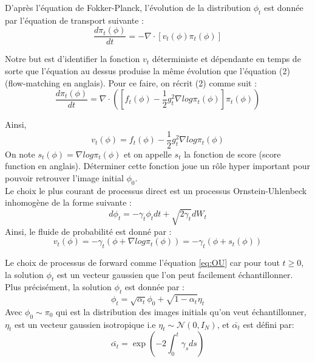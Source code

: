 \documentclass[a4paper,10pt]{article}
\theoremstyle{definition} %
\theoremstyle{definition} %
\theoremstyle{definition} %
\theoremstyle{definition} %
\begin{document}
D'après l'équation de Fokker-Planck, l'évolution de la distribution $\phi_t$ est donnée par l'équation de transport suivante :
\[\frac{d\pi_t(\phi)}{dt} =-\nabla \cdot [v_t(\phi)\pi_t(\phi)]\]

Notre but est d'identifier la fonction $v_t$ déterministe et dépendante en temps de sorte que l'équation au dessus produise la même évolution que l'équation (2) (flow-matching en anglais). Pour ce faire, on récrit (2) comme suit :
\[\frac{d\pi_t(\phi)}{dt} =\nabla \cdot([f_t(\phi)-\frac{1}{2}g_t^2\nabla log\pi_t(\phi)]\pi_t(\phi))\]

Ainsi,
\[v_t(\phi) =f_t(\phi)-\frac{1}{2}g_t^2\nabla log\pi_t(\phi) \]
On note $s_t(\phi) = \nabla log\pi_t(\phi)$ et on appelle $s_t$ la fonction de score (score function en anglais). Déterminer cette fonction joue un rôle hyper important pour pouvoir retrouver l'image initial $\phi_0$.\\

Le choix le plus courant de processus direct est un processus Ornstein-Uhlenbeck inhomogène de la forme suivante :
\begin{equation}\label{eq:OU}
    d\phi_t = -\gamma_t\phi_tdt + \sqrt{2\gamma_t}dW_t
\end{equation}
Ainsi, le fluide de probabilité est donné par :
\begin{equation}\label{eq:backward}
    v_t(\phi) = -\gamma_t(\phi+\nabla log \pi_t(\phi)) = -\gamma_t(\phi+s_t(\phi))
\end{equation}

Le choix de processus de forward comme l'équation \eqref{eq:OU} car pour tout $t \geq 0$, la solution $\phi_t$ est un vecteur gaussien que l'on peut facilement échantillonner. Plus précisément, la solution $\phi_t$ est donnée par :
\begin{equation}\label{eq:solforphi}
    \phi_t = \sqrt{\alpha_t}\phi_0 + \sqrt{1-\alpha_t}\eta_t
\end{equation}
Avec $\phi_0 \sim \pi_0$ qui est la distribution des images initials qu'on veut échantillonner, $\eta_t$ est un vecteur gaussien isotropique i.e $\eta_t \sim \mathcal{N}(0, I_N)$, et $\bar{\alpha_t}$ est défini par: \[\bar{\alpha_t} = \exp{\left(-2\int_0^t \gamma_s ds\right)}\]
\end{document}

